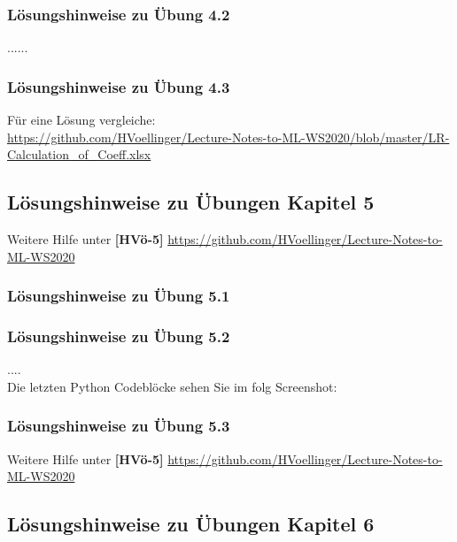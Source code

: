 \documentclass[12pt]{article}
\begin{document}
\subsubsection{Lösungshinweise zu Übung 4.2}
......\\
\subsubsection{Lösungshinweise zu Übung 4.3}

Für eine Lösung vergleiche:\\

\url{https://github.com/HVoellinger/Lecture-Notes-to-ML-WS2020/blob/master/LR-Calculation_of_Coeff.xlsx}\\

\newpage

\subsection{Lösungshinweise zu Übungen Kapitel 5}

\hspace*{-1.8cm} Weitere Hilfe unter \textbf{[HVö-5]} \url{https://github.com/HVoellinger/Lecture-Notes-to-ML-WS2020}\\

\subsubsection{Lösungshinweise zu Übung 5.1}


\subsubsection{Lösungshinweise zu Übung 5.2}
....\\

Die letzten Python Codeblöcke sehen Sie im folg Screenshot: 




\subsubsection{Lösungshinweise zu Übung 5.3}

\hspace*{-1.8cm} Weitere Hilfe unter \textbf{[HVö-5]} \url{https://github.com/HVoellinger/Lecture-Notes-to-ML-WS2020}\\


\newpage

\subsection{Lösungshinweise zu Übungen Kapitel 6}
\end{document}
